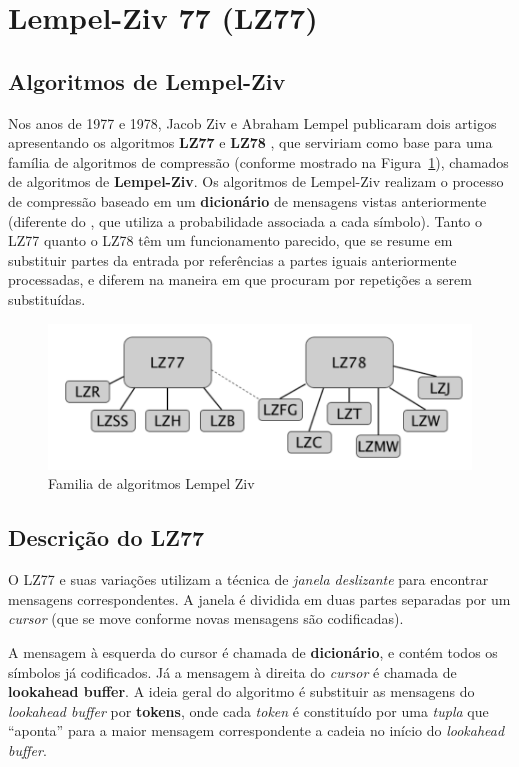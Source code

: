 \pagebreak

\section{Lempel-Ziv 77 (LZ77)}

\subsection{Algoritmos de Lempel-Ziv}
Nos anos de 1977 e 1978, Jacob Ziv e Abraham Lempel publicaram dois artigos apresentando os algoritmos \textbf{LZ77} e \textbf{LZ78} \cite{LZ}, que serviriam como base para uma família de algoritmos de compressão (conforme mostrado na Figura~\ref{fig:lz77}), chamados de algoritmos de \textbf{Lempel-Ziv}.
Os algoritmos de Lempel-Ziv realizam o processo de compressão baseado em um \textbf{dicionário} de mensagens vistas anteriormente (diferente do , que utiliza a probabilidade associada a cada símbolo). 
Tanto o LZ77 quanto o LZ78 têm um funcionamento parecido, que se resume em substituir partes da entrada por referências a partes iguais anteriormente processadas, e diferem na maneira em que procuram por repetições a serem substituídas. 

\begin{figure}[H]
   \centering
   \includegraphics[scale=0.75]{figs/lz77fam.png}
    \caption{Familia de algoritmos Lempel Ziv}
    \label{fig:lz77}
 \end{figure}

\subsection{Descrição do LZ77}
O LZ77 e suas variações utilizam a técnica de \emph{janela deslizante} para encontrar mensagens correspondentes. 
A janela é dividida em duas partes separadas por um \emph{cursor} (que se move conforme novas mensagens são codificadas).

A mensagem à esquerda do cursor é chamada de \textbf{dicionário}, e contém todos os símbolos já codificados. Já a mensagem à direita do \emph{cursor} é chamada de \textbf{lookahead buffer}.
A ideia geral do algoritmo é substituir as mensagens do \emph{lookahead buffer} por \textbf{tokens}, onde cada \emph{token} é constituído por uma \emph{tupla} que ``aponta''  para a maior mensagem correspondente a cadeia no início do \emph{lookahead buffer}.

